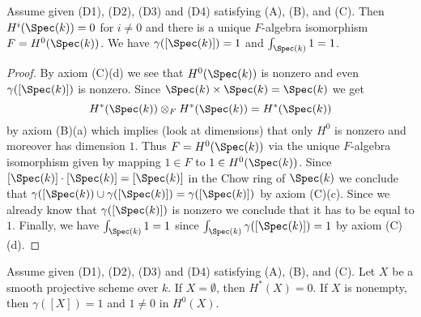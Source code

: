 \begin{lemma}
\label{lemma-base}
Assume given (D1), (D2), (D3) and (D4) satisfying (A), (B), and (C).
Then $H^i(\Spec(k)) = 0$ for $i \not = 0$ and there is a
unique $F$-algebra isomorphism $F = H^0(\Spec(k))$.
We have $\gamma([\Spec(k)]) = 1$ and $\int_{\Spec(k)} 1 = 1$.
\end{lemma}

\begin{proof}
By axiom (C)(d) we see that $H^0(\Spec(k))$ is nonzero and even
$\gamma([\Spec(k)])$ is nonzero.
Since $\Spec(k) \times \Spec(k) = \Spec(k)$ we get
$$
H^*(\Spec(k)) \otimes_F H^*(\Spec(k)) = H^*(\Spec(k))
$$
by axiom (B)(a) which implies (look at dimensions) that only
$H^0$ is nonzero and moreover has dimension $1$. Thus
$F = H^0(\Spec(k))$ via the unique $F$-algebra isomorphism
given by mapping $1 \in F$ to $1 \in H^0(\Spec(k))$.
Since $[\Spec(k)] \cdot [\Spec(k)] = [\Spec(k)]$ in the
Chow ring of $\Spec(k)$ we conclude that
$\gamma([\Spec(k)) \cup \gamma([\Spec(k)]) = \gamma([\Spec(k)])$
by axiom (C)(c). Since we already know that $\gamma([\Spec(k)])$ is nonzero
we conclude that it has to be equal to $1$.
Finally, we have $\int_{\Spec(k)} 1 = 1$ since
$\int_{\Spec(k)} \gamma([\Spec(k)]) = 1$
by axiom (C)(d).
\end{proof}

\begin{lemma}
\label{lemma-unit}
Assume given (D1), (D2), (D3) and (D4) satisfying (A), (B), and (C).
Let $X$ be a smooth projective scheme over $k$.
If $X = \emptyset$, then $H^*(X) = 0$.
If $X$ is nonempty, then $\gamma([X]) = 1$ and $1 \not = 0$ in $H^0(X)$.
\end{lemma}

